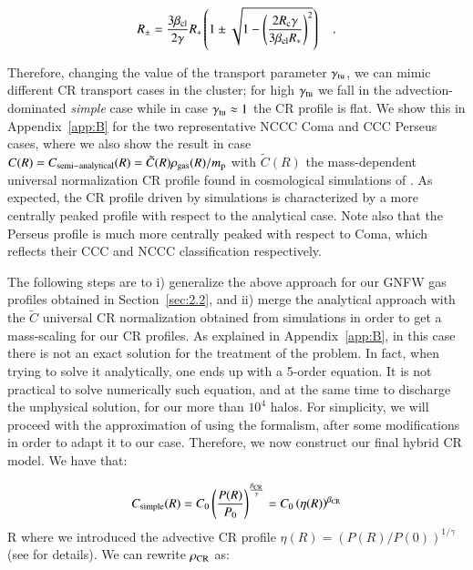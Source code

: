 \documentclass[traditabstract]{aa}
\begin{document}
\begin{equation}
R_{\pm} = \frac{3\beta_{\rm{cl}}}{2\gamma}R_{*}\left(1\pm\sqrt{1-\left(\frac{2R_{\rm{c}}\gamma}{3\beta_{\rm{cl}}R_{*}}\right)^{2}}\right) \quad .
\label{eq:Rpm}
\end{equation} 

Therefore, changing the value of the transport parameter $\gamma_{\rm{tu}}$, we can mimic different CR transport cases in the cluster; for high $\gamma_{\rm{tu}}$ we fall in the advection-dominated \emph{simple} case while in case $\gamma_{\rm{tu}}\approx1$ the CR profile is flat. We show this in Appendix~\ref{app:B} for the two representative NCCC Coma and CCC Perseus cases, where we also show the result in case $C(R)=C_{\rm{semi-analytical}}(R)=\tilde{C}(R)\rho_{\rm{gas}}(R)/m_{\rm{p}}$ with $\tilde{C}(R)$ the mass-dependent universal normalization CR profile found in cosmological simulations of \cite{2010MNRAS.409..449P}. As expected, the CR profile driven by simulations is characterized by a more centrally peaked profile with respect to the analytical case. Note also that the Perseus profile is much more centrally peaked with respect to Coma, which reflects their CCC and NCCC classification respectively.

The following steps are to i) generalize  the above approach for our GNFW gas profiles obtained in Section~\ref{sec:2.2}, and ii) merge the \cite{2011A&A...527A..99E} analytical approach with the $\tilde{C}$ universal CR normalization obtained from simulations in order to get a mass-scaling for our CR profiles. As explained in Appendix~\ref{app:B}, in this case there is not an exact solution for the \cite{2011A&A...527A..99E} treatment of the problem. In fact, when trying to solve it analytically, one ends up with a 5-order equation. It is not practical to solve numerically such equation, and at the same time to discharge the unphysical solution, for our more than $10^4$ halos. For simplicity, we will proceed with the approximation of using the \cite{2011A&A...527A..99E} formalism, after some modifications in order to adapt it to our case. Therefore, we now construct our final hybrid CR model. We have that:

\begin{equation}
C_{\rm{simple}}(R)=C_{0} \left( \frac{P(R)}{P_{0}} \right)^{\frac{\beta_{\rm{CR}}}{\gamma}} = C_{0} \left( \eta(R) \right)^{\beta_{\rm{CR}}}
\label{eq:Csimple_1}
\end{equation} 
R
where we introduced the advective CR profile $\eta(R)=(P(R)/P(0))^{1/\gamma}$ (see \citealp{2011A&A...527A..99E} for details). We can rewrite $\rho_{\rm{CR}}$ as:
\end{document}
